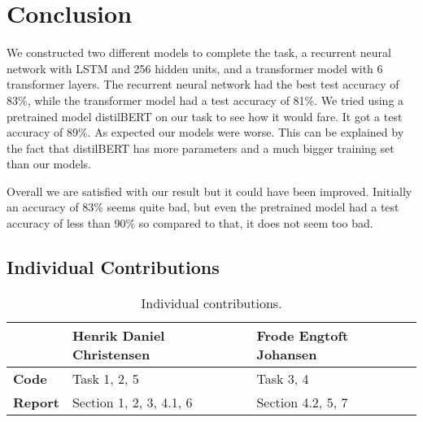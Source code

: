 \section{Conclusion}
We constructed two different models to complete the task, a recurrent neural network with LSTM and 256 hidden units, and a transformer model with 6 transformer layers. The recurrent neural network had the best test accuracy of 83\%, while the transformer model had a test accuracy of 81\%. We tried using a pretrained model distilBERT on our task to see how it would fare. It got a test accuracy of 89\%. As expected our models were worse. This can be explained by the fact that distilBERT has more parameters and a much bigger training set than our models. 

Overall we are satisfied with our result but it could have been improved. Initially an accuracy of 83\% seems quite bad, but even the pretrained model had a test accuracy of less than 90\% so compared to that, it does not seem too bad. 

\subsection{Individual Contributions}
\begin{table}[H]
    \centering
    \begin{tabular}{|l|l|l|}
    \hline
                    & \textbf{Henrik Daniel Christensen}    & \textbf{Frode Engtoft Johansen} \\ \hline
    \textbf{Code}   & Task 1, 2, 5                          & Task 3, 4\\ \hline
    \textbf{Report} & Section 1, 2, 3, 4.1, 6                 & Section 4.2, 5, 7 \\ \hline
    \end{tabular}
    \caption{Individual contributions.}
    \label{tab:individual_contributions}
\end{table}

